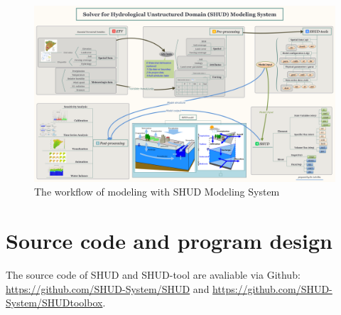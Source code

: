 \documentclass[]{scrbook}
\begin{document}
\begin{figure}
\centering
\includegraphics{./Fig/autoSHUD.png}
\caption{The workflow of modeling with SHUD Modeling System}
\end{figure}

\chapter{Source code and program
design}\label{source-code-and-program-design}

The source code of SHUD and SHUD-tool are avaliable via Github:
\url{https://github.com/SHUD-System/SHUD} and
\url{https://github.com/SHUD-System/SHUDtoolbox}.


\end{document}
